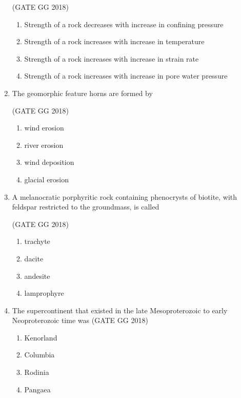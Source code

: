 \documentclass[journal]{IEEEtran}
\begin{document}
\begin{enumerate}[start=1]
\hfill(GATE GG 2018)
\begin{enumerate}
\item Strength of a rock decreases with increase in confining pressure
\item Strength of a rock increases with increase in temperature
\item Strength of a rock increases with increase in strain rate
\item Strength of a rock increases with increase in pore water pressure
\end{enumerate}

\item The geomorphic feature horns  are formed by 

\hfill(GATE GG 2018)
\begin{multicols}{2}
\begin{enumerate}
\item wind erosion
\item river erosion
\item wind deposition
\item glacial erosion
\end{enumerate}
\end{multicols}

\item A melanocratic porphyritic rock containing phenocrysts of biotite, with feldspar restricted to the groundmass, is called  

\hfill(GATE GG 2018)
\begin{multicols}{4}
\begin{enumerate}
\item trachyte
\item dacite
\item andesite
\item lamprophyre
\end{enumerate}
\end{multicols}

\item The supercontinent that existed in the late Mesoproterozoic to early Neoproterozoic time was  
\hfill(GATE GG 2018)
\begin{multicols}{4}
\begin{enumerate}
\item Kenorland
\item Columbia
\item Rodinia
\item Pangaea
\end{enumerate}
\end{multicols}


\end{enumerate}
\end{document}
